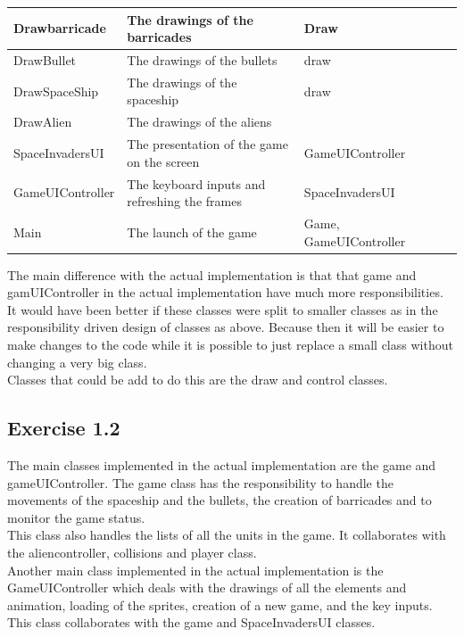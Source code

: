 \documentclass[10pt]{article}
\begin{document}
\begin{center}
\begin{tabular}{ | p{3cm} | p{5cm} | p{3cm} | p{2cm} | p{2cm} |}
  Drawbarricade & The drawings of the barricades & Draw & &  \\  \hline
  DrawBullet & The drawings of the bullets & draw & &  \\  \hline
  DrawSpaceShip & The drawings of the spaceship & draw & &  \\  \hline
  DrawAlien  & The drawings of the aliens & & &  \\  \hline
  SpaceInvadersUI & The presentation of the game on the screen & GameUIController & &  \\  \hline
  GameUIController & The keyboard inputs and refreshing the frames & SpaceInvadersUI & &  \\  \hline
  Main & The launch of the game & Game, GameUIController & &  \\  \hline
    \end{tabular}
\end{center}
\hfill\break
The main difference with the actual implementation is that that game and gamUIController in the actual implementation have much more responsibilities.\\
It would have been better if these classes were split to smaller classes as in the responsibility driven design of classes as above. Because then it will be easier to make changes to the code while it is possible to just replace a small class without changing a very big class. \\
Classes that could be add to do this are the draw and control classes. 

 \subsection*{Exercise 1.2}
The main classes implemented in the actual implementation are the game and gameUIController.
The game class has the responsibility to handle the movements of the spaceship and the bullets, the creation of barricades and to monitor the game status.\\
 This class also handles the lists of all the units in the game. It collaborates with the aliencontroller, collisions and player class. \\
Another main class implemented in the actual implementation is the GameUIController which deals with the drawings of all the elements and animation, loading of the sprites, creation of a new game,  and the key inputs.
 This class collaborates with the game and SpaceInvadersUI classes.\\
\end{document}
